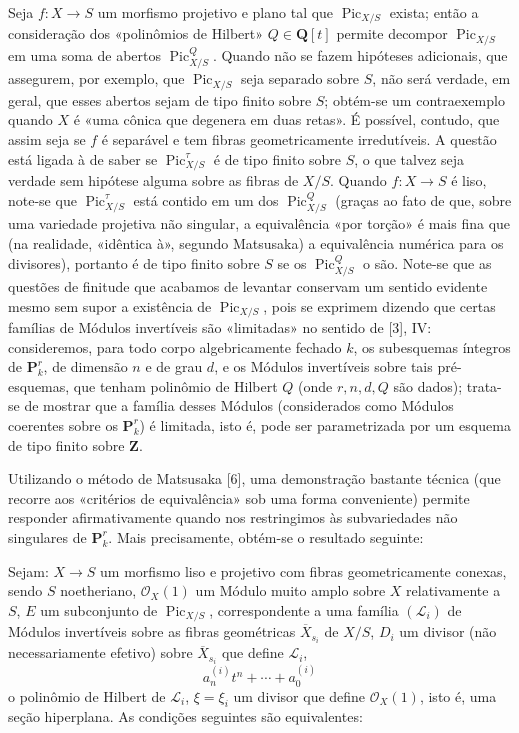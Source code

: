 Seja $f:X\longrightarrow S$ um morfismo projetivo e plano tal que
$\operatorname{Pic}_{X/S}$ exista; então a consideração dos «polinômios de
Hilbert» $Q\in\mathbf Q[t]$ permite decompor $\operatorname{Pic}_{X/S}$ em uma
soma de abertos $\operatorname{Pic}_{X/S}^Q$. Quando não se fazem hipóteses
adicionais, que assegurem, por exemplo, que $\operatorname{Pic}_{X/S}$ seja
separado sobre $S$, não será verdade, em geral, que esses abertos sejam de tipo
finito sobre $S$; obtém-se um contraexemplo quando $X$ é «uma cônica que
degenera em duas retas». É
possível, contudo, que assim seja se $f$ é separável e tem fibras
geometricamente irredutíveis. A questão está ligada à de saber se
$\operatorname{Pic}_{X/S}^\tau$ é de tipo finito sobre $S$, o que talvez seja
verdade sem hipótese alguma sobre as fibras de $X/S$. Quando
$f:X\longrightarrow S$ é liso, note-se que
$\operatorname{Pic}_{X/S}^\tau$ está contido em um dos
$\operatorname{Pic}_{X/S}^Q$ (graças ao fato de que, sobre uma variedade
projetiva não singular, a equivalência «por torção» é mais fina que (na
realidade, «idêntica à», segundo Matsusaka) a equivalência numérica para os
divisores), portanto é de tipo finito sobre $S$ se os
$\operatorname{Pic}_{X/S}^Q$ o são. Note-se que as questões de finitude que
acabamos de levantar conservam um sentido evidente mesmo sem supor a existência
de $\operatorname{Pic}_{X/S}$, pois se exprimem dizendo que certas famílias de
Módulos invertíveis são «limitadas» no sentido de [3], IV: consideremos, para
todo corpo algebricamente fechado $k$, os subesquemas íntegros de
$\mathbf P_k^r$, de dimensão $n$ e de grau $d$, e os Módulos invertíveis sobre
tais pré-esquemas, que tenham polinômio de Hilbert $Q$ (onde $r,n,d,Q$ são
dados); trata-se de mostrar que a família desses Módulos (considerados como
Módulos coerentes sobre os $\mathbf P_k^r$) é limitada, isto é, pode ser
parametrizada por um esquema de tipo finito sobre $\mathbf Z$.

Utilizando o método de Matsusaka [6], uma demonstração bastante técnica (que
recorre aos «critérios de equivalência» sob uma forma conveniente) permite
responder afirmativamente quando nos restringimos às subvariedades não
singulares de $\mathbf P_k^r$. Mais precisamente, obtém-se o resultado seguinte:

 Sejam: $X\longrightarrow S$ um
morfismo liso e projetivo com fibras geometricamente conexas, sendo $S$
noetheriano, $\mathcal O_X(1)$ um Módulo muito amplo sobre $X$ relativamente a
$S$, $E$ um subconjunto de $\operatorname{Pic}_{X/S}$, correspondente a uma
família $(\mathcal L_i)$ de Módulos invertíveis sobre as fibras geométricas
$\overline X_{s_i}$ de $X/S$, $D_i$ um divisor (não necessariamente efetivo)
sobre $\overline X_{s_i}$ que define $\mathcal L_i$,
\[
a_n^{(i)}t^n+\cdots+a_0^{(i)}
\]
o polinômio de Hilbert de $\mathcal L_i$, $\xi=\xi_i$ um divisor que define
$\mathcal O_X(1)$, isto é, uma seção hiperplana. As condições seguintes são
equivalentes:

